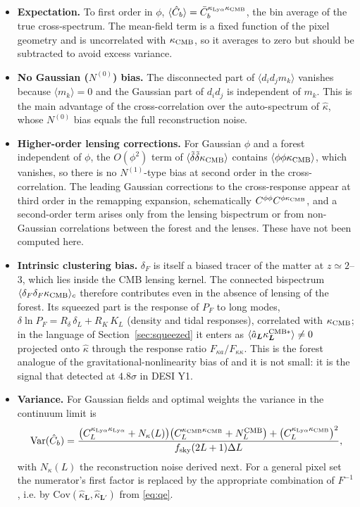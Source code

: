 \documentclass[11pt,a4paper]{article}
\newcommand{\dF}{\delta_F}
\newcommand{\dt}{\tilde\delta}
\newcommand{\vL}{\bm{L}}
\newcommand{\kcmb}{\kappa_{\rm CMB}}
\newcommand{\klya}{\kappa_{{\rm Ly}\alpha}}
\begin{document}
\begin{itemize}
\item \textbf{Expectation.} To first order in $\phi$, $\langle\hat C_b\rangle=\bar C_b^{\klya\kcmb}$, the bin average of the true cross-spectrum. The mean-field term is a fixed function of the pixel geometry and is uncorrelated with $\kcmb$, so it averages to zero but should be subtracted to avoid excess variance.
\item \textbf{No Gaussian ($N^{(0)}$) bias.} The disconnected part of $\langle d_id_jm_k\rangle$ vanishes because $\langle m_k\rangle=0$ and the Gaussian part of $d_id_j$ is independent of $m_k$. This is the main advantage of the cross-correlation over the auto-spectrum of $\hat\kappa$, whose $N^{(0)}$ bias equals the full reconstruction noise.
\item \textbf{Higher-order lensing corrections.} For Gaussian $\phi$ and a forest independent of $\phi$, the $O(\phi^2)$ term of $\langle\dt\dt\kcmb\rangle$ contains $\langle\phi\phi\kcmb\rangle$, which vanishes, so there is no $N^{(1)}$-type bias at second order in the cross-correlation. The leading Gaussian corrections to the cross-response appear at third order in the remapping expansion, schematically $C^{\phi\phi}C^{\phi\kcmb}$, and a second-order term arises only from the lensing bispectrum or from non-Gaussian correlations between the forest and the lenses. These have not been computed here.
\item \textbf{Intrinsic clustering bias.} $\dF$ is itself a biased tracer of the matter at $z\simeq2$--3, which lies inside the CMB lensing kernel. The connected bispectrum $\langle\dF\dF\kcmb\rangle_c$ therefore contributes even in the absence of lensing of the forest. Its squeezed part is the response of $P_F$ to long modes, $\delta\ln P_F=R_\delta\,\delta_L+R_K\,K_L$ (density and tidal responses), correlated with $\kcmb$; in the language of Section~\ref{sec:squeezed} it enters as $\langle\hat a_{\vL}\kappa^{{\rm CMB}*}_{\vL}\rangle\neq0$ projected onto $\hat\kappa$ through the response ratio $F_{\kappa a}/F_{\kappa\kappa}$. This is the forest analogue of the gravitational-nonlinearity bias of \citet{1803.04975} and it is not small: it is the signal that \citet{2405.14988} detected at $4.8\sigma$ in DESI Y1.
\item \textbf{Variance.} For Gaussian fields and optimal weights the variance in the continuum limit is
\begin{equation}
\mathrm{Var}(\hat C_b)=\frac{\big(C_L^{\klya\klya}+N_\kappa(L)\big)\big(C_L^{\kcmb\kcmb}+N_L^{\rm CMB}\big)+\big(C_L^{\klya\kcmb}\big)^2}{f_{\rm sky}(2L+1)\Delta L},
\label{eq:var}
\end{equation}
with $N_\kappa(L)$ the reconstruction noise derived next. For a general pixel set the numerator's first factor is replaced by the appropriate combination of $F^{-1}$, i.e. by $\mathrm{Cov}(\hat\kappa_{\vL},\hat\kappa_{\vL'})$ from \eqref{eq:qe}.
\end{itemize}
\end{document}
